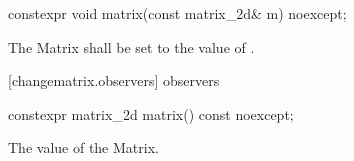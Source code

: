 \begin{itemdecl}
constexpr void matrix(const matrix_2d& m) noexcept;
\end{itemdecl}
\begin{itemdescr}
\pnum
\effects
The Matrix shall be set to the value of .
\end{itemdescr}

 [changematrix.observers]{ observers}

\begin{itemdecl}
constexpr matrix_2d matrix() const noexcept;
\end{itemdecl}
\begin{itemdescr}
\pnum
\returns
The value of the Matrix.
\end{itemdescr}
